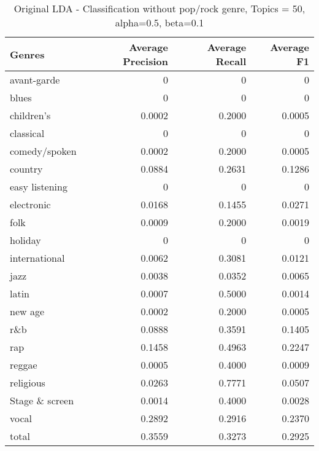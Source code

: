 \begin{table}[h]
\begin{tabular}{|l|r|r|r|}

\hline
\textbf{Genres} &  \textbf{Average Precision} & \textbf{Average Recall} & \textbf{Average F1} \\
\hline
avant-garde & 0	& 0& 	0\\
blues & 0	& 0	& 0\\
children's& 0.0002	& 0.2000	& 0.0005\\
classical& 0	& 0	& 0\\
comedy/spoken& 0.0002	& 0.2000	& 0.0005\\
country& 0.0884& 	0.2631	& 0.1286\\
easy listening& 0	& 0	& 0\\
electronic& 0.0168	& 0.1455	& 0.0271\\
folk& 0.0009	& 0.2000	& 0.0019\\
holiday& 0& 	0& 	0\\
international& 0.0062	& 0.3081& 	0.0121\\
jazz& 0.0038	& 0.0352& 	0.0065\\
latin& 0.0007	& 0.5000& 	0.0014\\
new age& 0.0002& 	0.2000	& 0.0005\\
r\&b& 0.0888	& 0.3591	& 0.1405\\
rap& 0.1458	& 0.4963	& 0.2247\\
reggae& 0.0005& 	0.4000	& 0.0009\\
religious& 0.0263	& 0.7771	& 0.0507\\
Stage \& screen& 0.0014& 	0.4000	& 0.0028\\
vocal& 0.2892	& 0.2916	& 0.2370\\
total& 0.3559	& 0.3273	& 0.2925\\
\hline
\end{tabular}
\caption{Original LDA - Classification without pop/rock genre, Topics = 50, alpha=0.5, beta=0.1}
\end{table}